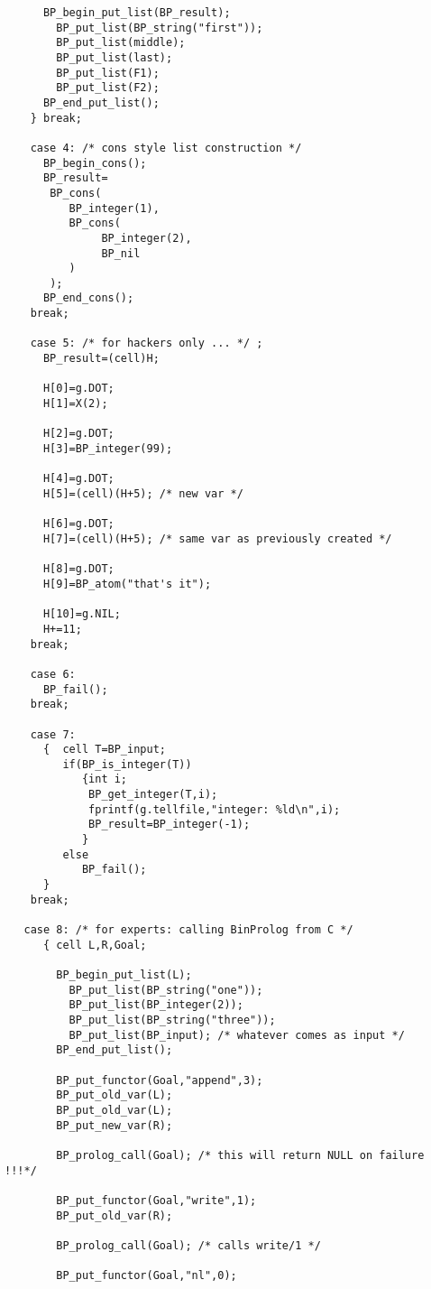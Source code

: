 \documentclass{article}
\begin{document}
{\begin{verbatim}
      BP_begin_put_list(BP_result);
        BP_put_list(BP_string("first"));
        BP_put_list(middle);
        BP_put_list(last);
        BP_put_list(F1);
        BP_put_list(F2);
      BP_end_put_list(); 
    } break;

    case 4: /* cons style list construction */
      BP_begin_cons();
      BP_result=
       BP_cons(
          BP_integer(1),
          BP_cons(
               BP_integer(2),
               BP_nil
          )
       );
      BP_end_cons();
    break;

    case 5: /* for hackers only ... */ ;
      BP_result=(cell)H;

      H[0]=g.DOT;
      H[1]=X(2);

      H[2]=g.DOT;
      H[3]=BP_integer(99);

      H[4]=g.DOT;
      H[5]=(cell)(H+5); /* new var */

      H[6]=g.DOT;
      H[7]=(cell)(H+5); /* same var as previously created */

      H[8]=g.DOT;
      H[9]=BP_atom("that's it");

      H[10]=g.NIL;
      H+=11;
    break;

    case 6:
      BP_fail();
    break;

    case 7: 
      {  cell T=BP_input;
         if(BP_is_integer(T))
            {int i;
             BP_get_integer(T,i);
             fprintf(g.tellfile,"integer: %ld\n",i);
             BP_result=BP_integer(-1);
            }
         else
            BP_fail();         
      } 
    break;

   case 8: /* for experts: calling BinProlog from C */
      { cell L,R,Goal;
        
        BP_begin_put_list(L);
          BP_put_list(BP_string("one"));
          BP_put_list(BP_integer(2));
          BP_put_list(BP_string("three"));
          BP_put_list(BP_input); /* whatever comes as input */
        BP_end_put_list();
  
        BP_put_functor(Goal,"append",3);
        BP_put_old_var(L);
        BP_put_old_var(L);
        BP_put_new_var(R);        

        BP_prolog_call(Goal); /* this will return NULL on failure !!!*/

        BP_put_functor(Goal,"write",1);
        BP_put_old_var(R);    

        BP_prolog_call(Goal); /* calls write/1 */

        BP_put_functor(Goal,"nl",0);


\end{verbatim}}
\end{document}
